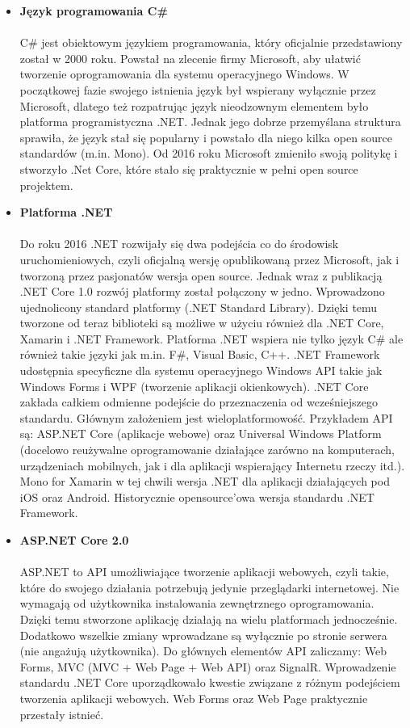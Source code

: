 \documentclass{article}
\begin{document}
\begin{itemize}
\item \textbf{Język programowania C\#} \\\\
C\# jest obiektowym językiem programowania, który oficjalnie przedstawiony został w 2000 roku. Powstał na zlecenie firmy Microsoft, aby ułatwić tworzenie oprogramowania dla systemu operacyjnego Windows. W początkowej fazie swojego istnienia język był wspierany wyłącznie przez Microsoft, dlatego też rozpatrując język nieodzownym elementem było platforma programistyczna .NET. Jednak jego dobrze przemyślana struktura sprawiła, że język stał się popularny i powstało dla niego kilka open source standardów (m.in. Mono). Od 2016 roku Microsoft zmieniło swoją politykę i stworzyło .Net Core, które stało się praktycznie w pełni open source projektem. 
\newpage
\item \textbf{Platforma .NET} \\\\
Do roku 2016 .NET rozwijały się dwa podejścia co do środowisk uruchomieniowych, czyli oficjalną
wersję opublikowaną przez Microsoft, jak i tworzoną przez pasjonatów wersja open source. Jednak wraz z
publikacją .NET Core 1.0 rozwój platformy został połączony w jedno. Wprowadzono ujednolicony standard
platformy (.NET Standard Library). Dzięki temu tworzone od teraz biblioteki są możliwe w użyciu również dla .NET Core, Xamarin i .NET Framework. Platforma .NET wspiera nie tylko język C\# ale również takie języki jak m.in. F\#, Visual Basic, C++. .NET Framework udostępnia specyficzne dla systemu operacyjnego Windows API takie jak Windows Forms i WPF (tworzenie aplikacji okienkowych). .NET Core zakłada całkiem odmienne podejście do przeznaczenia od wcześniejszego standardu. Głównym
założeniem jest wieloplatformowość. Przykładem API są: ASP.NET Core (aplikacje webowe) oraz Universal Windows Platform (docelowo reużywalne oprogramowanie działające zarówno na komputerach, urządzeniach mobilnych, jak i dla aplikacji wspierający Internetu rzeczy itd.). Mono for Xamarin w tej chwili wersja .NET dla aplikacji działających pod iOS oraz Android. Historycznie opensource’owa wersja standardu .NET Framework.
\item \textbf{ASP.NET Core 2.0} \\\\
ASP.NET to API umożliwiające tworzenie aplikacji webowych\cite{asp}, czyli takie, które do swojego działania potrzebują jedynie przeglądarki internetowej. Nie wymagają od użytkownika instalowania zewnętrznego oprogramowania. Dzięki temu stworzone aplikację działają na wielu platformach jednocześnie. Dodatkowo wszelkie zmiany wprowadzane są wyłącznie po stronie serwera (nie angażują użytkownika). Do głównych elementów API zaliczamy: Web Forms, MVC (MVC + Web Page + Web API) oraz SignalR. Wprowadzenie standardu .NET Core uporządkowało kwestie związane z różnym podejściem tworzenia aplikacji webowych. Web Forms oraz Web Page praktycznie przestały istnieć.


\end{itemize}
\end{document}
